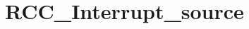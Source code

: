 \hypertarget{group___r_c_c___interrupt__source}{\section{R\-C\-C\-\_\-\-Interrupt\-\_\-source}
\label{group___r_c_c___interrupt__source}
}
